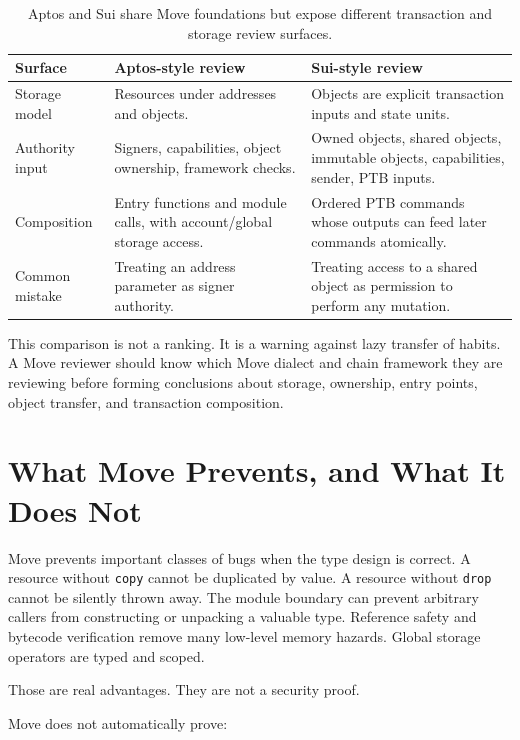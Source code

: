 \begin{table}[htbp]
\centering
\small
\renewcommand{\arraystretch}{1.18}
\begin{tabularx}{\textwidth}{@{}>{\RaggedRight\arraybackslash}p{}>{\RaggedRight\arraybackslash}p{}X@{}}
\toprule
Surface & Aptos-style review & Sui-style review \\
\midrule
Storage model & Resources under addresses and objects. & Objects are explicit transaction inputs and state units. \\
Authority input & Signers, capabilities, object ownership, framework checks. & Owned objects, shared objects, immutable objects, capabilities, sender, PTB inputs. \\
Composition & Entry functions and module calls, with account/global storage access. & Ordered PTB commands whose outputs can feed later commands atomically. \\
Common mistake & Treating an address parameter as signer authority. & Treating access to a shared object as permission to perform any mutation. \\
\bottomrule
\end{tabularx}
\caption{Aptos and Sui share Move foundations but expose different transaction and storage review surfaces.}
\end{table}

This comparison is not a ranking. It is a warning against lazy transfer of habits. A Move reviewer should know which Move dialect and chain framework they are reviewing before forming conclusions about storage, ownership, entry points, object transfer, and transaction composition.

\section{What Move Prevents, and What It Does Not}

Move prevents important classes of bugs when the type design is correct. A resource without \texttt{copy} cannot be duplicated by value. A resource without \texttt{drop} cannot be silently thrown away. The module boundary can prevent arbitrary callers from constructing or unpacking a valuable type. Reference safety and bytecode verification remove many low-level memory hazards. Global storage operators are typed and scoped.

Those are real advantages. They are not a security proof.

Move does not automatically prove:

